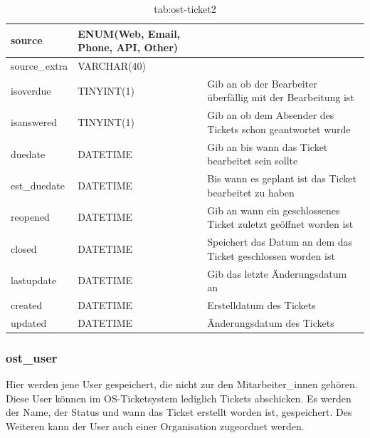 		\label{tab:ost_ticket}
		\newpage
		\begin{table}[h]
			\begin{tabular}{|p{3.5cm}|p{4cm}|p{6.2cm}|}
		\hline
		source & ENUM(Web, Email, Phone, API, Other) &\\
		\hline
		source\_extra & VARCHAR(40)&\\
		\hline
		isoverdue & TINYINT(1) & Gib an ob der Bearbeiter überfällig mit der Bearbeitung ist\\
		\hline
		isanswered & TINYINT(1) & Gib an ob dem Absender des Tickets schon geantwortet wurde\\
		\hline
		duedate & DATETIME & Gib an bis wann das Ticket bearbeitet sein sollte\\
		\hline
		est\_duedate & DATETIME & Bis wann es geplant ist das Ticket bearbeitet zu haben \\
		\hline
		reopened & DATETIME & Gib an wann ein geschlossenes Ticket zuletzt geöffnet worden ist \\
		\hline
		closed & DATETIME & Speichert das Datum an dem das Ticket geschlossen worden ist \\
		\hline
		lastupdate & DATETIME & Gib das letzte Änderungsdatum an \\
		\hline
		created & DATETIME & Erstelldatum des Tickets\\
		\hline
		updated & DATETIME & Änderungsdatum des Tickets\\
		\hline
	\end{tabular}
	\caption{tab:ost-ticket2}
\end{table}
\label{tab:ost_ticket2}

\newpage


\subsubsection{ost\_user}

Hier werden jene User gespeichert, die nicht zur den Mitarbeiter\_innen gehören. Diese User können im OS-Ticketsystem lediglich Tickets abschicken. Es werden der Name, der Status und wann das Ticket erstellt worden ist, gespeichert. Des Weiteren kann der User auch einer Organisation zugeordnet werden.

